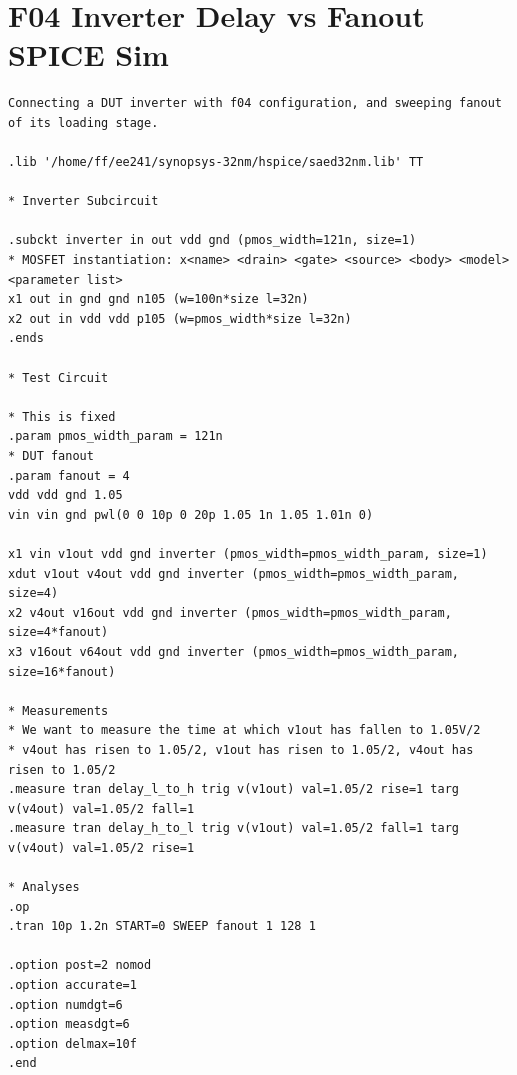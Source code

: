 \documentclass[11pt]{article}
\begin{document}
\section{F04 Inverter Delay vs Fanout SPICE Sim}
\begin{verbatim}
Connecting a DUT inverter with f04 configuration, and sweeping fanout of its loading stage.

.lib '/home/ff/ee241/synopsys-32nm/hspice/saed32nm.lib' TT

* Inverter Subcircuit

.subckt inverter in out vdd gnd (pmos_width=121n, size=1)
* MOSFET instantiation: x<name> <drain> <gate> <source> <body> <model> <parameter list>
x1 out in gnd gnd n105 (w=100n*size l=32n)
x2 out in vdd vdd p105 (w=pmos_width*size l=32n)
.ends

* Test Circuit

* This is fixed
.param pmos_width_param = 121n
* DUT fanout
.param fanout = 4
vdd vdd gnd 1.05
vin vin gnd pwl(0 0 10p 0 20p 1.05 1n 1.05 1.01n 0)

x1 vin v1out vdd gnd inverter (pmos_width=pmos_width_param, size=1)
xdut v1out v4out vdd gnd inverter (pmos_width=pmos_width_param, size=4)
x2 v4out v16out vdd gnd inverter (pmos_width=pmos_width_param, size=4*fanout)
x3 v16out v64out vdd gnd inverter (pmos_width=pmos_width_param, size=16*fanout)

* Measurements
* We want to measure the time at which v1out has fallen to 1.05V/2
* v4out has risen to 1.05/2, v1out has risen to 1.05/2, v4out has risen to 1.05/2
.measure tran delay_l_to_h trig v(v1out) val=1.05/2 rise=1 targ v(v4out) val=1.05/2 fall=1
.measure tran delay_h_to_l trig v(v1out) val=1.05/2 fall=1 targ v(v4out) val=1.05/2 rise=1

* Analyses
.op
.tran 10p 1.2n START=0 SWEEP fanout 1 128 1

.option post=2 nomod
.option accurate=1
.option numdgt=6
.option measdgt=6
.option delmax=10f
.end
\end{verbatim}
\end{document}
